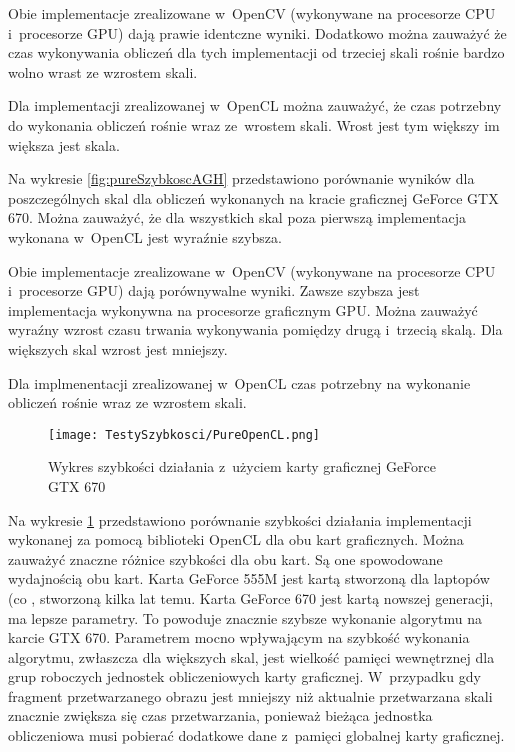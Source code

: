 Obie implementacje zrealizowane w~OpenCV (wykonywane na procesorze CPU i~procesorze GPU) dają prawie identczne wyniki. Dodatkowo można zauważyć że czas wykonywania obliczeń dla tych implementacji od trzeciej skali rośnie bardzo wolno wrast ze wzrostem skali.

Dla implementacji zrealizowanej w~OpenCL można zauważyć, że czas potrzebny do wykonania obliczeń rośnie wraz ze~wrostem skali. Wrost jest tym większy im większa jest skala.

Na wykresie \ref{fig:pureSzybkoscAGH} przedstawiono porównanie wyników dla poszczególnych skal dla obliczeń wykonanych na kracie graficznej GeForce GTX 670. Można zauważyć, że dla wszystkich skal poza pierwszą implementacja wykonana w~OpenCL jest wyraźnie szybsza.

Obie implementacje zrealizowane w~OpenCV (wykonywane na procesorze CPU i~procesorze GPU) dają porównywalne wyniki. Zawsze szybsza jest implementacja wykonywna na procesorze graficznym GPU. Można zauważyć wyraźny wzrost czasu trwania wykonywania pomiędzy drugą i~trzecią skalą. Dla większych skal wzrost jest mniejszy. 

Dla implmenentacji zrealizowanej w~OpenCL czas potrzebny na wykonanie obliczeń rośnie wraz ze wzrostem skali. 

\begin{figure}[h]
\begin{center}
\texttt{[image: TestySzybkosci/PureOpenCL.png]}
\end{center}
\caption{Wykres szybkości działania z~użyciem karty graficznej GeForce GTX 670}
\label{fig:pureOpenCL}
\end{figure}

Na wykresie \ref{fig:pureOpenCL} przedstawiono porównanie szybkości działania implementacji wykonanej za pomocą biblioteki OpenCL dla obu kart graficznych. Można zauważyć znaczne różnice szybkości dla obu kart. Są one spowodowane wydajnością obu kart. Karta GeForce 555M jest kartą stworzoną dla laptopów (co , stworzoną kilka lat temu. Karta GeForce 670 jest kartą nowszej generacji, ma lepsze parametry. To powoduje znacznie szybsze wykonanie algorytmu na karcie GTX 670. Parametrem mocno wpływającym na szybkość wykonania algorytmu, zwłaszcza dla większych skal, jest wielkość pamięci wewnętrznej dla grup roboczych jednostek obliczeniowych karty graficznej. W~przypadku gdy fragment przetwarzanego obrazu jest mniejszy niż aktualnie przetwarzana skali znacznie zwiększa się czas przetwarzania, ponieważ bieżąca jednostka obliczeniowa musi pobierać dodatkowe dane z~pamięci globalnej karty graficznej.
